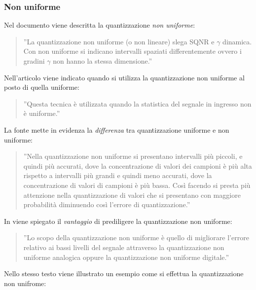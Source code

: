 \documentclass[a4paper]{report} %
\begin{document}
\subsubsection{Non uniforme}
Nel documento \cite{art:rif.18} viene descritta la quantizzazione \textit{non uniforme}:
\begin{quote}
	''La quantizzazione non uniforme (o non lineare) slega SQNR e $\gamma$ dinamica. Con non uniforme si indicano intervalli spaziati differentemente ovvero i gradini $\gamma$ non hanno la stessa dimensione.''
\end{quote}
Nell'articolo \cite{art:rif.7} viene indicato quando si utilizza la quantizzazione non uniforme al posto di quella uniforme:
\begin{quote}
	''Questa tecnica è utilizzata quando la statistica del segnale in ingresso non è uniforme.''
\end{quote}
La fonte \cite{art:rif.6} mette in evidenza la \textit{differenza} tra quantizzazione uniforme e non uniforme:
\begin{quote}
	''Nella quantizzazione non uniforme si presentano intervalli più piccoli, e quindi più accurati, dove la concentrazione di valori dei campioni è più alta rispetto a intervalli più grandi e quindi meno accurati, dove la concentrazione di valori di campioni è più bassa. Così facendo si presta più attenzione nella quantizzazione di valori che si presentano con maggiore probabilità diminuendo così l'errore di quantizzazione.'' 
\end{quote}
In \cite{art:rif.8} viene spiegato il \textit{vantaggio} di prediligere la quantizzazione non uniforme:
\begin{quote}
	''Lo scopo della quantizzazione non uniforme è quello di migliorare l'errore relativo ai bassi livelli del segnale attraverso la quantizzazione non uniforme analogica oppure la quantizzazione non uniforme digitale.''
\end{quote}
Nello stesso testo viene illustrato un esempio come si effettua la quantizzazione non unifrome:
\end{document}
